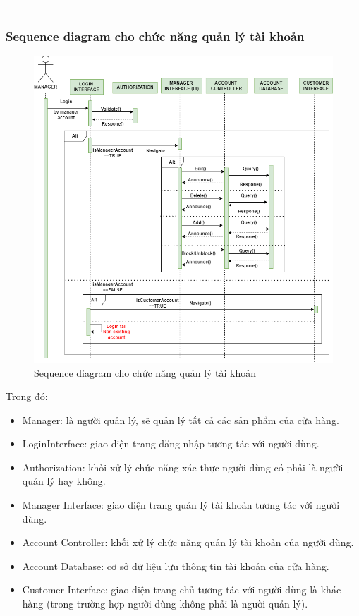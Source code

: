 \begin {list} {-}{}
\subsubsection{Sequence diagram cho chức năng quản lý tài khoản}
\begin{figure}[h]
    \centering
    \includegraphics[scale=0.5]{images/hieu/chap-3/manage-account-sequence-diagram.png}
    \caption{Sequence diagram cho chức năng quản lý tài khoản}
\end{figure}
Trong đó:
\begin{itemize}
    \item Manager: là người quản lý, sẽ quản lý tất cả các sản phẩm của cửa hàng.
    \item LoginInterface: giao diện trang đăng nhập tương tác với người dùng.
    \item Authorization: khối xử lý chức năng xác thực người dùng có phải là người quản lý hay không.
    \item Manager Interface: giao diện trang quản lý tài khoản tương tác với người dùng.
    \item Account Controller: khối xử lý chức năng quản lý tài khoản của người dùng.
    \item Account Database: cơ sở dữ liệu lưu thông tin tài khoản của cửa hàng.
    \item Customer Interface: giao diện trang chủ tương tác với người dùng là khác hàng (trong trường hợp người dùng không phải là người quản lý).
\end{itemize}
\newpage

\end{list}
